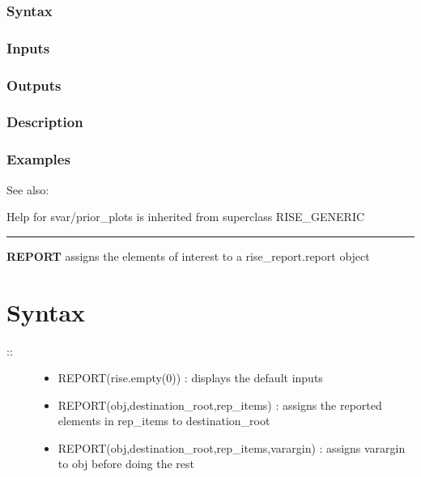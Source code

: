 \documentclass[letterpaper,10pt,english]{sphinxmanual}
\begin{document}
\subsubsection{Syntax}
\label{classes/models/@svar/svar:id91}

\subsubsection{Inputs}
\label{classes/models/@svar/svar:id92}

\subsubsection{Outputs}
\label{classes/models/@svar/svar:id93}

\subsubsection{Description}
\label{classes/models/@svar/svar:id94}

\subsubsection{Examples}
\label{classes/models/@svar/svar:id95}
See also:

Help for svar/prior\_plots is inherited from superclass RISE\_GENERIC


\bigskip\hrule{}\bigskip

\label{classes/models/@svar/svar:report}
\textbf{REPORT} assigns the elements of interest to a rise\_report.report object


\section{Syntax}
\label{classes/models/@svar/svar:id96}\begin{description}
\item[{::}] \leavevmode\begin{itemize}
\item {} 
REPORT(rise.empty(0)) : displays the default inputs

\item {} 
REPORT(obj,destination\_root,rep\_items) : assigns the reported
elements in rep\_items to destination\_root

\item {} 
REPORT(obj,destination\_root,rep\_items,varargin) : assigns varargin to
obj before doing the rest

\end{itemize}

\end{description}
\end{document}
